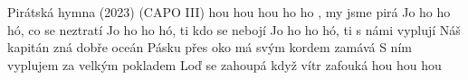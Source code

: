 \begin{TEXT}{Pirátská hymna  (2023)}
\SLOKA* (CAPO III)\NL
\SLOKA* {} hou hou hou
\REFREN {} ho ho  , my jsme pirá \NL
Jo ho ho hó, co se neztratí\NL
Jo ho ho hó, ti kdo se nebojí\NL
Jo ho ho hó, ti s námi vyplují
\SLOKA* Náš kapitán\NL
zná dobře oceán\NL
Pásku přes oko má\NL
svým kordem zamává\NL
\SLOKA*S ním vyplujem\NL
za velkým pokladem\NL
Loď se zahoupá\NL
když vítr zafouká
\SLOKA* {} hou hou hou
\REFRENHRAJ
\end{TEXT}
